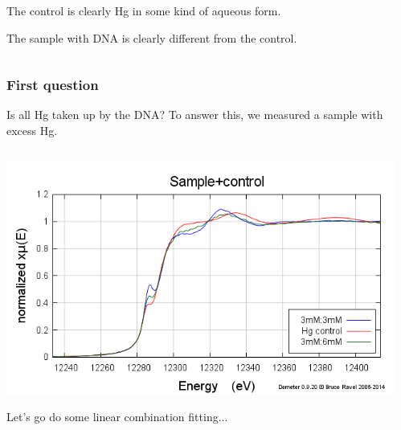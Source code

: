 \documentclass[10pt, xcolor=x11names, compress]{beamer}
\begin{document}
\begin{frame}
\begin{columns}
\begin{column}{0.6\linewidth}
      \bigskip

      The control is clearly Hg in some kind of aqueous form.

      \bigskip

      The sample with DNA is clearly different from the control.
    \end{column}
  \end{columns}
\end{frame}

\begin{frame}
  \frametitle{First question}
  \begin{exampleblock}{Is all Hg taken up by the DNA?}
    \centering To answer this, we measured a sample with excess Hg.
  \end{exampleblock}
  \begin{columns}[T]
    \begin{column}{0.5\linewidth}
      \includegraphics[width=\linewidth]{images/excess.png}

      \medskip

      Let's go do some linear combination fitting...
    \end{column}
    \begin{column}{0.5\linewidth}
    \end{column}
  \end{columns}
\end{frame}
\end{document}
